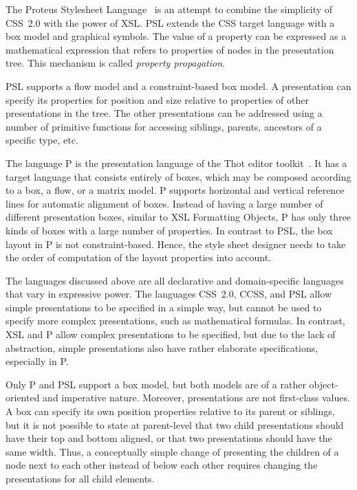  The Proteus Stylesheet Language~\cite{marden98psl} is an attempt to combine the simplicity of CSS~2.0 with the power of XSL. PSL extends the CSS target language with a box model and graphical symbols. The value of a property can be expressed as a mathematical expression that refers to properties of nodes in the presentation tree. This mechanism is called {\em property propagation}. 

PSL supports a flow model and a constraint-based box model. A presentation can specify its properties for position and size relative to properties of other presentations in the tree. The other presentations can be addressed using a number of primitive functions for accessing siblings, parents, ancestors of a specific type, etc.

 The  language P is the presentation language of the Thot editor toolkit~\cite{quint97thot}. It has a target language that consists entirely of boxes, which may be composed according to a box, a flow, or a matrix model. P supports horizontal and vertical reference lines for automatic alignment of boxes. Instead of having a large number of different presentation boxes, similar to XSL Formatting Objects, P has only three kinds of boxes with a large number of properties. In contrast to PSL, the box layout in P is not constraint-based. \bc Hence, the style sheet designer needs to take the order of computation of the layout properties into account. \ec 


The languages discussed above are all declarative and domain-specific languages that vary in expressive power. The languages CSS~2.0, CCSS, and PSL allow simple presentations to be specified in a simple way, but cannot be used to specify more complex presentations, such as mathematical formulas. In contrast, XSL and P allow complex presentations to be specified, but due to the lack of abstraction, simple presentations also have rather elaborate specifications, especially in P. 

Only P and PSL support a box model, but both models are of a rather object-oriented and imperative nature. Moreover, presentations are not first-class values. A box can specify its own position properties relative to its parent or siblings, but it is not possible to state at parent-level that two child presentations should have their top and bottom aligned, or that two presentations should have the same width. \bc Thus, a conceptually simple change of presenting the children of a node next to each other instead of below each other requires changing the presentations for all child elements.\ec 

